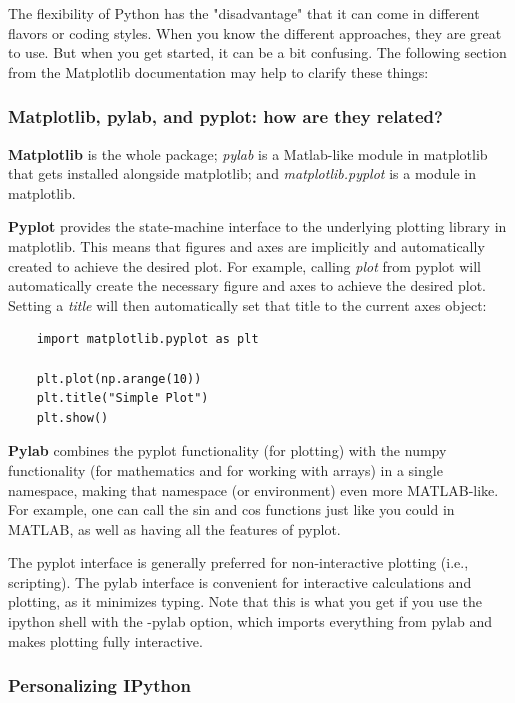 The flexibility of Python has the "disadvantage" that it can come in
different flavors or coding styles. When you know the different approaches,
they are great to use. But when you get started, it can be a bit confusing.
The following section from the Matplotlib documentation may help to clarify
these things:

\subsubsection{Matplotlib, pylab, and pyplot: how are they related?}

\textbf{Matplotlib} is the whole package; \emph{pylab} is a Matlab-like module in matplotlib that gets installed alongside matplotlib; and \emph{matplotlib.pyplot} is a module in matplotlib.

\textbf{Pyplot} provides the state-machine interface to the underlying plotting library in matplotlib. This means that figures and axes are implicitly and automatically created to achieve the desired plot. For example, calling \emph{plot }from pyplot will automatically create the necessary figure and axes to achieve the desired plot. Setting a \emph{title }will then automatically set that title to the current axes object:

\begin{lstlisting}
    import matplotlib.pyplot as plt

    plt.plot(np.arange(10))
    plt.title("Simple Plot")
    plt.show()
\end{lstlisting}

\textbf{Pylab} combines the pyplot functionality (for plotting) with the numpy functionality (for mathematics and for working with arrays) in a single namespace, making that namespace (or environment) even more MATLAB-like. For example, one can call the sin and cos functions just like you could in MATLAB, as well as having all the features of pyplot.

The pyplot interface is generally preferred for non-interactive plotting (i.e., scripting). The pylab interface is convenient for interactive calculations and plotting, as it minimizes typing. Note that this is what you get if you use the ipython shell with the -pylab option, which imports everything from pylab and makes plotting fully interactive.

\subsubsection{Personalizing IPython}


